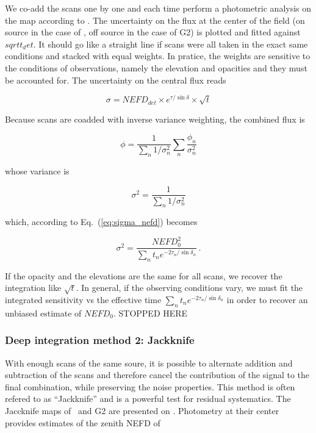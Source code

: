 We co-add the scans one by one and each time perform a photometric analysis on
the map according to {}. The uncertainty on
the flux at the center of the field (on source in the case of \hls, off source
in the case of G2) is plotted and fitted against $sqrt{t_det}$. It should go
like a straight line if scans were all taken in the exact same conditions and
stacked with equal weights. In pratice, the weights are sensitive to the
conditions of observations, namely the elevation and opacities  and they must be accounted for. The
uncertainty on the central flux reads

\begin{equation}
\sigma = NEFD_{det}\times e^{\tau/\sin\delta}\times\sqrt{t}
\label{eq:sigma_nefd}
\end{equation}

Because scans are coadded with inverse variance weighting, the combined flux is

\begin{equation}
\phi = \frac{1}{\sum_n 1/\sigma_n^2}\sum_n\frac{\phi_n}{\sigma_n^2}
\end{equation}

whose variance is

\begin{equation}
\sigma^2 = \frac{1}{\sum_n 1/\sigma_n^2}
\end{equation}

which, according to Eq.~(\ref{eq:sigma_nefd}) becomes

\begin{equation}
\sigma^2 = \frac{NEFD_0^2}{\sum_{n}t_n e^{-2\tau_n/\sin\delta_n}}\,.
\label{eq:sigma_tau_w8}
\end{equation}

If the opacity and the elevations are the same for all scans, we recover the
integration like $\sqrt{t}$. In general, if the observing conditions vary, we
must fit the integrated sensitivity vs the effective time $\sum_{n}t_n
e^{-2\tau_n/\sin\delta_n}$ in order to recover an unbiased estimate of
$NEFD_0$.{\color{red} STOPPED HERE}\\


\subsubsection{Deep integration method 2: Jackknife}

With enough scans of the same soure, it is possible to alternate addition and
subtraction of the scans and therefore cancel the contribution of the signal to
the final combination, while preserving the noise properties. This method is
often refered to as ``Jackknife'' and is a powerful test for residual
systematics. The Jaccknife maps of \hls\ and G2 are presented on
. Photometry at their center provides estimates of
  the zenith NEFD of 


